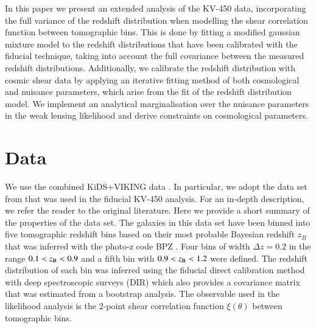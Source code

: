 \documentclass{aa}
\begin{document}
In this paper we present an extended analysis of the KV-450 data, incorporating the full variance of the redshift distribution when modelling the shear correlation function between tomographic bins. This is done by fitting a modified gaussian mixture model to the redshift distributions that have been calibrated with the fiducial technique, taking into account the full covariance between the measured redshift distributions. Additionally, we calibrate the redshift distribution with cosmic shear data by applying an iterative fitting method of both cosmological and nuisance parameters, which arise from the fit of the redshift distribution model. We implement an analytical marginalisation over the nuisance parameters in the weak lensing likelihood and derive constraints on cosmological parameters.
\section{Data}
We use the combined KiDS+VIKING data \citep{2019A&A...632A..34W}. In particular, we adopt the data set from  that was used in the fiducial KV-450 analysis. For an in-depth description, we refer the reader to the original literature. Here we provide a short summary of the properties of the data set. 
The galaxies in this data set have been binned into five tomographic redshift bins based on their most probable Bayesian redshift $z_B$ that was inferred with the photo-z code {\sc BPZ} \citep{2000ApJ...536..571B}. Four bins of width $\Delta z = 0.2$ in the range $0.1 < z_{\rm B} <0.9$ and a fifth bin with $0.9 < z_{\rm B} < 1.2$ were defined. The redshift distribution of each bin was inferred using the fiducial direct calibration method with deep spectroscopic surveys (DIR) which also provides a covariance matrix that was estimated from a bootstrap analysis. The observable used in the likelihood analysis is the 2-point shear correlation function $\xi(\theta)$ between tomographic bins.
\end{document}
